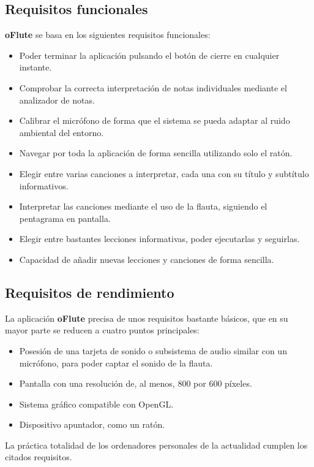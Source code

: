 \subsection{Requisitos funcionales}

\textbf{oFlute} se basa en los siguientes requisitos funcionales:
\begin{itemize}
\item Poder terminar la aplicación pulsando el botón de cierre en cualquier
  instante.
\item Comprobar la correcta interpretación de notas individuales mediante el
  analizador de notas.
\item Calibrar el micrófono de forma que el sistema se pueda adaptar al ruido
  ambiental del entorno.
\item Navegar por toda la aplicación de forma sencilla utilizando solo el ratón.
\item Elegir entre varias canciones a interpretar, cada una con su título y
  subtítulo informativos.
\item Interpretar las canciones mediante el uso de la flauta, siguiendo el
  pentagrama en pantalla.
\item Elegir entre bastantes lecciones informativas, poder ejecutarlas y
  seguirlas.
\item Capacidad de añadir nuevas lecciones y canciones de forma sencilla.
\end{itemize}

\subsection{Requisitos de rendimiento}

La aplicación \textbf{oFlute} precisa de unos requisitos bastante básicos,
que en su mayor parte se reducen a cuatro puntos principales:
\begin{itemize}
\item Posesión de una tarjeta de sonido o subsistema de audio similar con un
  micrófono, para poder captar el sonido de la flauta.
\item Pantalla con una resolución de, al menos, 800 por 600 píxeles.
\item Sistema gráfico compatible con OpenGL.
\item Dispositivo apuntador, como un ratón.
\end{itemize}

La práctica totalidad de los ordenadores personales de la actualidad cumplen los
citados requisitos.

